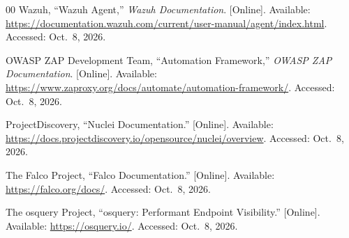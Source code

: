 \documentclass[journal]{IEEEtran}
\begin{document}
\begin{thebibliography}{00}
Wazuh,
``Wazuh Agent,''
\textit{Wazuh Documentation}.
[Online]. Available:
\url{https://documentation.wazuh.com/current/user-manual/agent/index.html}.
Accessed: Oct.~8, 2026.

OWASP ZAP Development Team,
``Automation Framework,''
\textit{OWASP ZAP Documentation}.
[Online]. Available:
\url{https://www.zaproxy.org/docs/automate/automation-framework/}.
Accessed: Oct.~8, 2026.

ProjectDiscovery,
``Nuclei Documentation.''
[Online]. Available:
\url{https://docs.projectdiscovery.io/opensource/nuclei/overview}.
Accessed: Oct.~8, 2026.

The Falco Project,
``Falco Documentation.''
[Online]. Available:
\url{https://falco.org/docs/}.
Accessed: Oct.~8, 2026.

The osquery Project,
``osquery: Performant Endpoint Visibility.''
[Online]. Available:
\url{https://osquery.io/}.
Accessed: Oct.~8, 2026.

\end{thebibliography}
\end{document}
